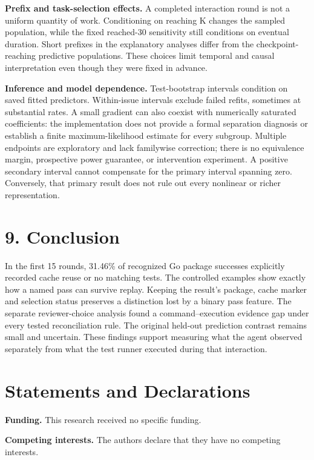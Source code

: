 \documentclass[10pt,a4paper]{article}
\begin{document}
\textbf{Prefix and task-selection effects.} A completed interaction round is not a uniform quantity of work. Conditioning on reaching K changes the sampled population, while the fixed reached-30 sensitivity still conditions on eventual duration. Short prefixes in the explanatory analyses differ from the checkpoint-reaching predictive populations. These choices limit temporal and causal interpretation even though they were fixed in advance.

\textbf{Inference and model dependence.} Test-bootstrap intervals condition on saved fitted predictors. Within-issue intervals exclude failed refits, sometimes at substantial rates. A small gradient can also coexist with numerically saturated coefficients: the implementation does not provide a formal separation diagnosis or establish a finite maximum-likelihood estimate for every subgroup. Multiple endpoints are exploratory and lack familywise correction; there is no equivalence margin, prospective power guarantee, or intervention experiment. A positive secondary interval cannot compensate for the primary interval spanning zero. Conversely, that primary result does not rule out every nonlinear or richer representation.



\section{9. Conclusion}
In the first 15 rounds, 31.46\% of recognized Go package successes explicitly recorded cache reuse or no matching tests. The controlled examples show exactly how a named pass can survive replay. Keeping the result's package, cache marker and selection status preserves a distinction lost by a binary pass feature. The separate reviewer-choice analysis found a command--execution evidence gap under every tested reconciliation rule. The original held-out prediction contrast remains small and uncertain. These findings support measuring what the agent observed separately from what the test runner executed during that interaction.

\section{Statements and Declarations}
\textbf{Funding.} This research received no specific funding.

\textbf{Competing interests.} The authors declare that they have no competing interests.
\end{document}

